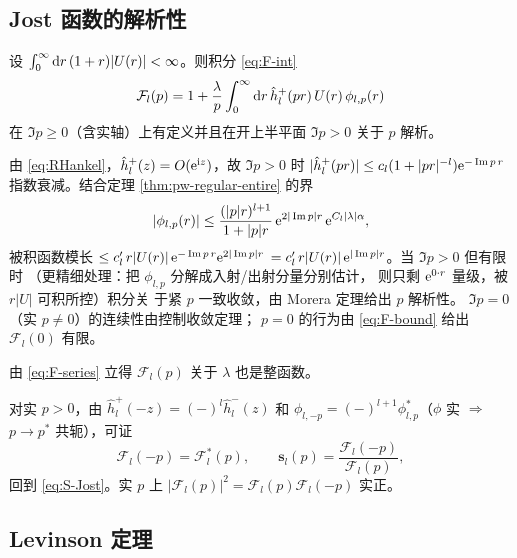 \subsection{Jost 函数的解析性}\label{sec:pw-Jost-analytic}

\begin{theorem}
\label{thm:pw-Jost-analytic}
设 $\int_0^\infty\mathrm{d} r\,(1+r)|U(r)|<\infty$。则积分
\eqref{eq:F-int}
\[
\mathcal F_l(p)=1+\frac{\lambda}{p}\int_0^\infty\mathrm{d} r\,
\hat h_l^+(pr)\,U(r)\,\phi_{l,p}(r)
\]
在 $\Im p\ge 0$（含实轴）上有定义并且在开上半平面 $\Im p>0$
关于 $p$ 解析。
\end{theorem}

\begin{proof*}
由 \eqref{eq:RHankel}，$\hat h_l^+(z)=O(\mathrm{e}^{\mathrm{i} z})$，故
$\Im p>0$ 时 $|\hat h_l^+(pr)|\le c_l(1+|pr|^{-l})\mathrm{e}^{-\Im p\,r}$
指数衰减。结合定理 \ref{thm:pw-regular-entire} 的界
\[
|\phi_{l,p}(r)|\le \frac{(|p|r)^{l+1}}{1+|p|r}\,
\mathrm{e}^{2|\Im p|r}\,\mathrm{e}^{C_l|\lambda|\alpha},
\]
被积函数模长 $\le c_l'\,r|U(r)|\,\mathrm{e}^{-\Im p\,r}\mathrm{e}^{2|\Im p|r}$
$=c_l'\,r|U(r)|\,\mathrm{e}^{|\Im p|r}$。当 $\Im p>0$ 但有限时
（更精细处理：把 $\phi_{l,p}$ 分解成入射/出射分量分别估计，
则只剩 $\mathrm{e}^{0\cdot r}$ 量级，被 $r|U|$ 可积所控）积分关
于紧 $p$ 一致收敛，由 Morera 定理给出 $p$ 解析性。
$\Im p=0$（实 $p\ne 0$）的连续性由控制收敛定理；
$p=0$ 的行为由 \eqref{eq:F-bound} 给出 $\mathcal F_l(0)$
有限。\hfill

由 \eqref{eq:F-series} 立得 $\mathcal F_l(p)$ 关于
$\lambda$ 也是整函数。
\end{proof*}

\begin{remark}[$p\to-p$ 的对称性]
对实 $p>0$，由 $\hat h_l^+(-z)=(-)^l\hat h_l^-(z)$ 和
$\phi_{l,-p}=(-)^{l+1}\phi_{l,p}^*$（$\phi$ 实 $\Rightarrow$
$p\to p^*$ 共轭），可证
\begin{equation}\label{eq:pw-Jost-sym}
\mathcal F_l(-p)=\mathcal F_l^*(p),\qquad
\mathbf s_l(p)=\frac{\mathcal F_l(-p)}{\mathcal F_l(p)},
\end{equation}
回到 \eqref{eq:S-Jost}。实 $p$ 上 $|\mathcal F_l(p)|^2=
\mathcal F_l(p)\mathcal F_l(-p)$ 实正。
\end{remark}

\subsection{Levinson 定理}\label{sec:pw-Levinson}

